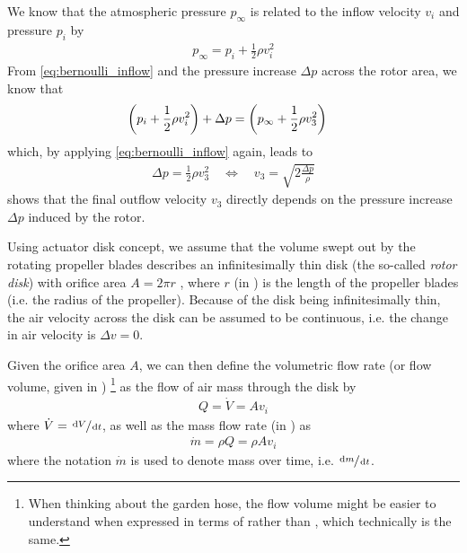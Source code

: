 
We know that the atmospheric pressure $p_\infty$ is related to the inflow velocity $v_i$ and pressure $p_i$ by
%
\begin{align}
p_\infty = p_i + \frac{1}{2}\rho v_i^2 \label{eq:bernoulli_inflow_x}
\end{align}
%
From \cref{eq:bernoulli_inflow} and the pressure increase $\Delta p$ across the
rotor area, we know that 
%
\begin{align}
 \left(p_i + \frac{1}{2}\rho v_i^2 \right) + \Delta p &= \left( p_\infty + \frac{1}{2}\rho v_3^2 \right) \label{eq:bernoulli_outflow_x}
\end{align}
%
which, by applying \cref{eq:bernoulli_inflow} again, leads to
%
\begin{align}
 \Delta p = \frac{1}{2}\rho v_3^2 
 \quad \Leftrightarrow \quad 
 v_3 = \sqrt{2\frac{\Delta p}{\rho}} \label{eq:deltap_vinfty} 
\end{align}
%
 shows that the final outflow velocity $v_3$ directly depends on the pressure increase $\Delta p$ induced by the rotor.


Using actuator disk concept, we assume that the volume swept out by the rotating propeller blades describes an infinitesimally thin disk (the so-called \textit{rotor disk}) with orifice area $A = 2\pi r$%
, where $r$ (in \withunit{\metre}) is the length of the propeller blades (i.e. the radius of the propeller).
Because of the disk being infinitesimally thin, the air velocity across the disk can be assumed to be continuous, i.e. the change in air velocity is $\Delta v = 0$. 

Given the orifice area $A$, we can then define the volumetric flow rate %
(or flow volume, given in \withunit{\cubic\metre\per\second})%
\footnote{When
thinking about the garden hose, the flow volume might be easier to understand when expressed in terms of  rather than , which technically is the same.}
as the flow of air mass through the disk by
%
\begin{align}
Q = \dot{V} = A v_i \label{eq:flowvolume}
\end{align}
%
where $\dot{V} = \sfrac{\mathop{}\!\mathrm{d} V}{\mathop{}\!\mathrm{d} t}$, as well as the mass flow rate (in \withunit{\kilo\gram\per\second}) as
%
\begin{align}
\dot{m} = \rho Q = \rho A v_i \label{eq:massflow}
\end{align}
%
where the notation $\dot{m}$ is used to denote mass over time, i.e. $\sfrac{\mathop{}\!\mathrm{d} m}{\mathop{}\!\mathrm{d} t}$. %

